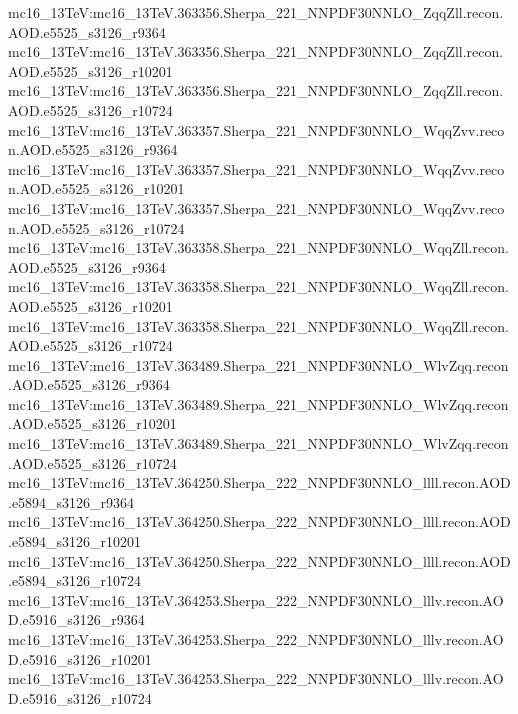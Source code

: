 { mc16\_13TeV:mc16\_13TeV.363356.Sherpa\_221\_NNPDF30NNLO\_ZqqZll.recon.AOD.e5525\_s3126\_r9364\newline    
 mc16\_13TeV:mc16\_13TeV.363356.Sherpa\_221\_NNPDF30NNLO\_ZqqZll.recon.AOD.e5525\_s3126\_r10201\newline    
 mc16\_13TeV:mc16\_13TeV.363356.Sherpa\_221\_NNPDF30NNLO\_ZqqZll.recon.AOD.e5525\_s3126\_r10724\newline    
 mc16\_13TeV:mc16\_13TeV.363357.Sherpa\_221\_NNPDF30NNLO\_WqqZvv.recon.AOD.e5525\_s3126\_r9364\newline    
 mc16\_13TeV:mc16\_13TeV.363357.Sherpa\_221\_NNPDF30NNLO\_WqqZvv.recon.AOD.e5525\_s3126\_r10201\newline    
 mc16\_13TeV:mc16\_13TeV.363357.Sherpa\_221\_NNPDF30NNLO\_WqqZvv.recon.AOD.e5525\_s3126\_r10724\newline    
 mc16\_13TeV:mc16\_13TeV.363358.Sherpa\_221\_NNPDF30NNLO\_WqqZll.recon.AOD.e5525\_s3126\_r9364\newline    
 mc16\_13TeV:mc16\_13TeV.363358.Sherpa\_221\_NNPDF30NNLO\_WqqZll.recon.AOD.e5525\_s3126\_r10201\newline    
 mc16\_13TeV:mc16\_13TeV.363358.Sherpa\_221\_NNPDF30NNLO\_WqqZll.recon.AOD.e5525\_s3126\_r10724\newline    
 mc16\_13TeV:mc16\_13TeV.363489.Sherpa\_221\_NNPDF30NNLO\_WlvZqq.recon.AOD.e5525\_s3126\_r9364\newline    
 mc16\_13TeV:mc16\_13TeV.363489.Sherpa\_221\_NNPDF30NNLO\_WlvZqq.recon.AOD.e5525\_s3126\_r10201\newline    
 mc16\_13TeV:mc16\_13TeV.363489.Sherpa\_221\_NNPDF30NNLO\_WlvZqq.recon.AOD.e5525\_s3126\_r10724\newline    
 mc16\_13TeV:mc16\_13TeV.364250.Sherpa\_222\_NNPDF30NNLO\_llll.recon.AOD.e5894\_s3126\_r9364\newline    
 mc16\_13TeV:mc16\_13TeV.364250.Sherpa\_222\_NNPDF30NNLO\_llll.recon.AOD.e5894\_s3126\_r10201\newline    
 mc16\_13TeV:mc16\_13TeV.364250.Sherpa\_222\_NNPDF30NNLO\_llll.recon.AOD.e5894\_s3126\_r10724\newline    
 mc16\_13TeV:mc16\_13TeV.364253.Sherpa\_222\_NNPDF30NNLO\_lllv.recon.AOD.e5916\_s3126\_r9364\newline    
 mc16\_13TeV:mc16\_13TeV.364253.Sherpa\_222\_NNPDF30NNLO\_lllv.recon.AOD.e5916\_s3126\_r10201\newline    
 mc16\_13TeV:mc16\_13TeV.364253.Sherpa\_222\_NNPDF30NNLO\_lllv.recon.AOD.e5916\_s3126\_r10724\newline    
}

